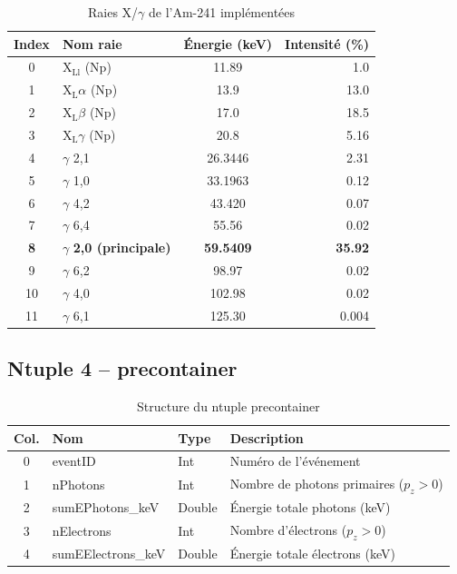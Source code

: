 \documentclass[11pt,a4paper]{article}
\begin{document}
\begin{table}[h]
\centering
\small
\begin{tabular}{clcr}
\toprule
\rowcolor{headerblue!20}
\textbf{Index} & \textbf{Nom raie} & \textbf{Énergie (keV)} & \textbf{Intensité (\%)} \\
\midrule
0 & X$_\text{Ll}$ (Np) & 11.89 & 1.0 \\
1 & X$_\text{L}\alpha$ (Np) & 13.9 & 13.0 \\
2 & X$_\text{L}\beta$ (Np) & 17.0 & 18.5 \\
3 & X$_\text{L}\gamma$ (Np) & 20.8 & 5.16 \\
4 & $\gamma$ 2,1 & 26.3446 & 2.31 \\
5 & $\gamma$ 1,0 & 33.1963 & 0.12 \\
6 & $\gamma$ 4,2 & 43.420 & 0.07 \\
7 & $\gamma$ 6,4 & 55.56 & 0.02 \\
\rowcolor{yellow!30}
\textbf{8} & $\gamma$ \textbf{2,0 (principale)} & \textbf{59.5409} & \textbf{35.92} \\
9 & $\gamma$ 6,2 & 98.97 & 0.02 \\
10 & $\gamma$ 4,0 & 102.98 & 0.02 \\
11 & $\gamma$ 6,1 & 125.30 & 0.004 \\
\bottomrule
\end{tabular}
\caption{Raies X/$\gamma$ de l'Am-241 implémentées}
\end{table}

\subsection{Ntuple 4 -- precontainer}

\begin{table}[h]
\centering
\begin{tabular}{clll}
\toprule
\rowcolor{headerblue!20}
\textbf{Col.} & \textbf{Nom} & \textbf{Type} & \textbf{Description} \\
\midrule
0 & eventID & Int & Numéro de l'événement \\
\rowcolor{lightgray}
1 & nPhotons & Int & Nombre de photons primaires ($p_z > 0$) \\
2 & sumEPhotons\_keV & Double & Énergie totale photons (keV) \\
\rowcolor{lightgray}
3 & nElectrons & Int & Nombre d'électrons ($p_z > 0$) \\
4 & sumEElectrons\_keV & Double & Énergie totale électrons (keV) \\
\bottomrule
\end{tabular}
\caption{Structure du ntuple precontainer}
\end{table}
\end{document}
